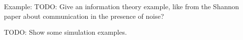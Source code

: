  Example: TODO: Give an information theory example, like from the Shannon paper about communication in the presence of noise?

TODO: Show some simulation examples. 



